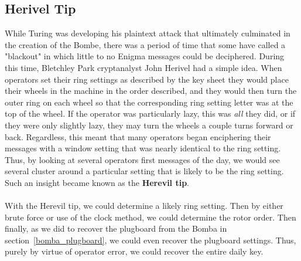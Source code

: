 
\subsection{Herivel Tip}
While Turing was developing his plaintext attack that ultimately
culminated in the creation of the Bombe, there was a period of time
that some have called a "blackout" in which little to no Enigma
messages could be deciphered. During this time, Bletchley Park
cryptanalyst John Herivel had a simple idea. When operators set their
ring settings as described by the key sheet they would place their
wheels in the machine in the order described, and they would then
turn the outer ring on each wheel so that the corresponding ring
setting letter was at the top of the wheel. If the operator was
particularly lazy, this was \emph{all} they did, or if they were only
slightly lazy, they may turn the wheels a couple turns forward or
back. Regardless, this meant that many operators began enciphering
their messages with a window setting that was nearly identical to the
ring setting. Thus, by looking at several operators first messages of
the day, we would see several cluster around a particular setting
that is likely to be the ring setting. Such an insight became known
as the {\bf{Herevil tip}}.
\\\\With the Herevil tip, we could determine a likely ring setting.
Then by either brute force or use of the clock method, we could
determine the rotor order. Then finally, as we did to recover the
plugboard from the Bomba in section~\ref{bomba_plugboard}, we could
even recover the plugboard settings. Thus, purely by virtue of
operator error, we could recover the entire daily key.


